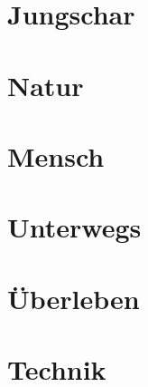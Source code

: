 



	
	\chapter{Jungschar}
	
	
	\chapter{Natur}
	
	
	\chapter{Mensch}
	
	
	\chapter{Unterwegs}
	
	
	\chapter{Überleben}
	
	
	\chapter{Technik}
	
	
